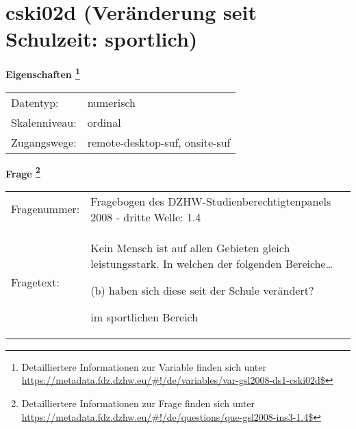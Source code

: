 
    \setcounter{footnote}{0}

    \vspace*{-1.8cm}
	\section{cski02d (Veränderung seit Schulzeit: sportlich)}
	\label{section:cski02d}



    \vspace*{0.5cm}
    \noindent\textbf{Eigenschaften
	\footnote{Detailliertere Informationen zur Variable finden sich unter
		\url{https://metadata.fdz.dzhw.eu/\#!/de/variables/var-gsl2008-ds1-cski02d$}}}\\
	\begin{tabularx}{\hsize}{@{}lX}
	Datentyp: & numerisch \\
	Skalenniveau: & ordinal \\
	Zugangswege: &
	  remote-desktop-suf, 
	  onsite-suf
 \\
    \end{tabularx}



				\vspace*{0.5cm}
                \noindent\textbf{Frage
	                \footnote{Detailliertere Informationen zur Frage finden sich unter
		              \url{https://metadata.fdz.dzhw.eu/\#!/de/questions/que-gsl2008-ins3-1.4$}}}\\
				\begin{tabularx}{\hsize}{@{}lX}
					Fragenummer: &
					  Fragebogen des DZHW-Studienberechtigtenpanels 2008 - dritte Welle:
					  1.4
 \\
					Fragetext: & Kein Mensch ist auf allen Gebieten gleich leistungsstark. In welchen der folgenden Bereiche…\par  (b) haben sich diese seit der Schule verändert?\par  im sportlichen Bereich \\
				\end{tabularx}





